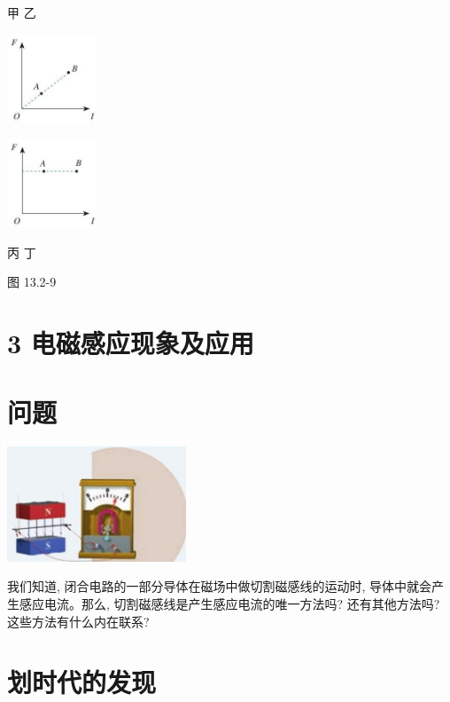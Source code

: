 \documentclass[10pt]{article}
\begin{document}
甲 乙

\begin{center}
\includegraphics[max width=0.2\textwidth]{images/01911d5f-8e38-70c0-b5b8-2b399bd115b6_118_530655.jpg}
\end{center}

\begin{center}
\includegraphics[max width=0.2\textwidth]{images/01911d5f-8e38-70c0-b5b8-2b399bd115b6_118_954067.jpg}
\end{center}

丙 丁

图 13.2-9

\section*{3 电磁感应现象及应用}

\section*{问题}

\begin{center}
\includegraphics[max width=0.4\textwidth]{images/01911d5f-8e38-70c0-b5b8-2b399bd115b6_119_773001.jpg}
\end{center}

我们知道, 闭合电路的一部分导体在磁场中做切割磁感线的运动时, 导体中就会产生感应电流。那么, 切割磁感线是产生感应电流的唯一方法吗? 还有其他方法吗? 这些方法有什么内在联系?

\section*{划时代的发现}
\end{document}
